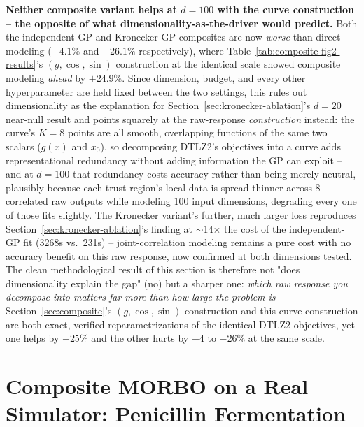\documentclass[11pt]{article}
\begin{document}
\textbf{Neither composite variant helps at $d{=}100$ with the curve
construction -- the opposite of what dimensionality-as-the-driver would
predict.} Both the independent-GP and Kronecker-GP composites are now
\emph{worse} than direct modeling ($-4.1\%$ and $-26.1\%$ respectively),
where Table~\ref{tab:composite-fig2-results}'s $(g,\cos,\sin)$
construction at the identical scale showed composite modeling \emph{ahead}
by $+24.9\%$. Since dimension, budget, and every other hyperparameter are
held fixed between the two settings, this rules out dimensionality as the
explanation for Section~\ref{sec:kronecker-ablation}'s $d{=}20$
near-null result and points squarely at the raw-response
\emph{construction} instead: the curve's $K{=}8$ points are all smooth,
overlapping functions of the same two scalars ($g(x)$ and $x_0$), so
decomposing DTLZ2's objectives into a curve adds representational
redundancy without adding information the GP can exploit -- and at
$d{=}100$ that redundancy costs accuracy rather than being merely neutral,
plausibly because each trust region's local data is spread thinner across
$8$ correlated raw outputs while modeling $100$ input dimensions,
degrading every one of those fits slightly. The Kronecker variant's
further, much larger loss reproduces
Section~\ref{sec:kronecker-ablation}'s finding at $\sim$14$\times$ the
cost of the independent-GP fit (3268s vs.\ 231s) -- joint-correlation
modeling remains a pure cost with no accuracy benefit on this raw response,
now confirmed at both dimensions tested. The clean methodological result
of this section is therefore not "does dimensionality explain the gap"
(no) but a sharper one: \emph{which raw response you decompose into
matters far more than how large the problem is} -- Section~\ref{sec:composite}'s
$(g,\cos,\sin)$ construction and this curve construction are both exact,
verified reparametrizations of the identical DTLZ2 objectives, yet one
helps by $+25\%$ and the other hurts by $-4$ to $-26\%$ at the same scale.

\section{Composite MORBO on a Real Simulator: Penicillin Fermentation}
\label{sec:penicillin}
\end{document}
